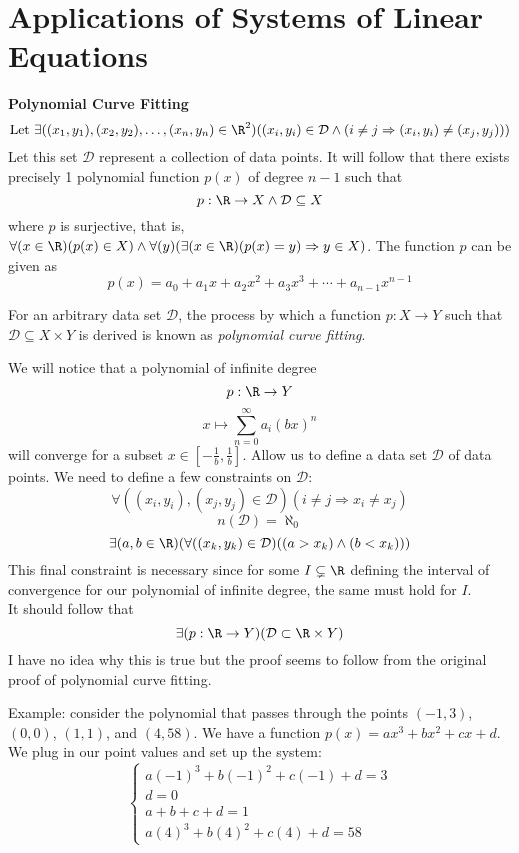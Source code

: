 \section{Applications of Systems of Linear Equations}
{\large\textbf{Polynomial Curve Fitting}}\\
$$\text{Let }\exists((x_1,y_1),(x_2,y_2),\ldots,(x_n,y_n)\in\R^2)((x_i,y_i)\in\mathcal{D}\land (i\neq j\Rightarrow(x_i,y_i)\neq(x_j,y_j)))$$
Let this set $\mathcal{D}$ represent a collection of data points. It will follow that there exists precisely 1 polynomial function $p(x)$ of degree $n-1$ such that
$$p:\R\rightarrow X\land\mathcal{D}\subseteq X$$
where $p$ is surjective, that is, $\forall(x\in\R)(p(x)\in X)\land\forall(y)(\exists(x\in\R)(p(x)=y)\Rightarrow y\in X)$. The function $p$ can be given as
$$p(x)=a_0+a_1x+a_2x^2+a_3x^3+\cdots+a_{n-1}x^{n-1}$$
\begin{definition}\label{def:4}
	For an arbitrary data set $\mathcal{D}$, the process by which a function $p:X\rightarrow Y$ such that $\mathcal{D}\subseteq X\times Y$ is derived is known as \emph{polynomial curve fitting}.
\end{definition}
\begin{remark}
	We will notice that a polynomial of infinite degree
	$$p:\R\rightarrow Y$$
	$$x\mapsto\sum_{n=0}^{\infty}a_i(bx)^n$$
	will converge for a subset $x\in\left[-\frac{1}{b},\frac{1}{b}\right]$. Allow us to define a data set $\mathcal{D}$ of data points. We need to define a few constraints on $\mathcal{D}$:
	$$\forall((x_i,y_i),(x_j,y_j)\in\mathcal{D})(i\neq j\Rightarrow x_i\neq x_j)$$
	$$n(\mathcal{D})=\aleph_0$$
	$$\exists(a,b\in\R)(\forall((x_k,y_k)\in\mathcal{D})((a>x_k)\land(b<x_k)))$$
	This final constraint is necessary since for some $I\subsetneq\R$ defining the interval of convergence for our polynomial of infinite degree, the same must hold for $I$.\\
	It should follow that
	$$\exists(p:\R\rightarrow Y)(\mathcal{D}\subset\R\times Y)$$
	I have no idea why this is true but the proof seems to follow from the original proof of polynomial curve fitting.
\end{remark}
Example: consider the polynomial that passes through the points $(-1,3)$, $(0,0)$, $(1,1)$, and $(4,58)$. We have a function $p(x)=ax^3+bx^2+cx+d$. We plug in our point values and set up the system:
$$\left\{\begin{array}{c}
	a(-1)^3+b(-1)^2+c(-1)+d=3\\
	d=0\\
	a+b+c+d=1\\
	a(4)^3+b(4)^2+c(4)+d=58
\end{array}\right.$$

